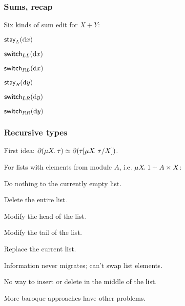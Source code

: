 \documentclass[table]{beamer}
\begin{document}
\begin{frame}
    \frametitle{Sums, recap}
    Six kinds of sum edit for $X + Y$:
    \begin{center}
        $\mathsf{stay}_L(\textrm{d} x)$

        $\mathsf{switch}_{LL}(\textrm{d} x)$

        $\mathsf{switch}_{RL}(\textrm{d} x)$

        \vspace{2ex}

        $\mathsf{stay}_R(\textrm{d} y)$

        $\mathsf{switch}_{LR}(\textrm{d} y)$

        $\mathsf{switch}_{RR}(\textrm{d} y)$
    \end{center}
\end{frame}


\begin{frame}
    \frametitle{Recursive types}
    First idea: $\partial(\mu X\!.\;\tau)\simeq\partial(\tau[\mu X\!.\;\tau/X])$.

    For lists with elements from module $A$, i.e. $\mu X\!.\;1+A \times X$:

    \begin{description}[$\mlstayr{\mlright\dx}$]
        \item[$\mlstayl\anything$] Do nothing to the currently empty list.
        \item[$\mlswitch_{\anything L}(\anything)$] Delete the entire list.
        \item[$\mlstayr{\mlleft{\d a}}$] Modify the head of the list.
        \item[$\mlstayr{\mlright\dx}$] Modify the tail of the list.
        \item[$\mlswitch_{\anything R}(\anything)$] Replace the current
            list.
    \end{description}

    Information never migrates; can't swap list elements.

    \alert{No way to insert or delete in the middle of the list.}

    \pause

    More baroque approaches have other problems.
\end{frame}
\end{document}
